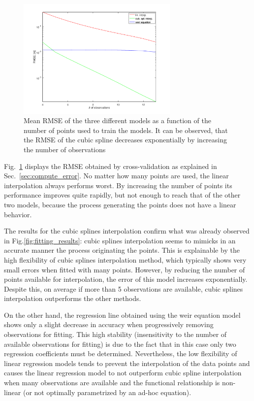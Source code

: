 \begin{figure}[h]
  \centering
  \includegraphics[width=0.7\textwidth]{Figures/fitting_errors.png}
  \caption{Mean RMSE of the three different models as a function of the number of points used to train the models. It can be observed, that the RMSE of the cubic spline decreases exponentially by increasing the number of observations}
  \label{fig:fitting_errors}
\end{figure}

Fig.~\ref{fig:fitting_errors} displays the RMSE obtained by cross-validation as explained in Sec.~\ref{sec:compute_error}.
No matter how many points are used, the linear interpolation always performs worst.
By increasing the number of points its performance improves quite rapidly, but not enough to reach that of the other two models, because the process generating the points does not have a linear behavior.
 
The results for the cubic splines interpolation confirm what was already observed in Fig.\ref{fig:fitting_results}:  cubic splines interpolation seems to mimicks in an accurate manner the process originating the points.  This is explainable by the high flexibility of cubic splines interpolation method, which typically shows very small errors when fitted with many points. However, by reducing the number of points available for interpolation, the error of this model increases exponentially. Despite this, on average if more than 5 observations are available, cubic splines interpolation outperforms the other methods.

On the other hand, the regression line obtained using the weir equation model shows only a slight decrease in accuracy when progressively removing observations for fitting. This high stability (insensitivity to the number of available observations for fitting) is due to the fact that in this case only two regression coefficients must be determined. Nevertheless, the low flexibility of linear regression models tends to prevent the interpolation of the data points and causes the linear regression model to not outperform cubic spline interpolation when many observations are available and the functional relationship is non-linear (or not optimally parametrized by an ad-hoc equation).  

